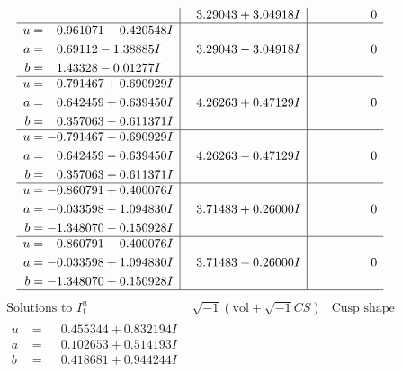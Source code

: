 \documentclass[1p]{elsarticle_modified}
\theoremstyle{definition}
\newcommand{\I}{\sqrt{-1}}
\begin{document}
$$\begin{array}{c|c|c}
 & \phantom{-}3.29043 + 3.04918 I & \phantom{-0.000000 } 0 \\ \hline\begin{aligned}
u &= -0.961071 - 0.420548 I \\
a &= \phantom{-}0.69112 - 1.38885 I \\
b &= \phantom{-}1.43328 - 0.01277 I\end{aligned}
 & \phantom{-}3.29043 - 3.04918 I & \phantom{-0.000000 } 0 \\ \hline\begin{aligned}
u &= -0.791467 + 0.690929 I \\
a &= \phantom{-}0.642459 + 0.639450 I \\
b &= \phantom{-}0.357063 - 0.611371 I\end{aligned}
 & \phantom{-}4.26263 + 0.47129 I & \phantom{-0.000000 } 0 \\ \hline\begin{aligned}
u &= -0.791467 - 0.690929 I \\
a &= \phantom{-}0.642459 - 0.639450 I \\
b &= \phantom{-}0.357063 + 0.611371 I\end{aligned}
 & \phantom{-}4.26263 - 0.47129 I & \phantom{-0.000000 } 0 \\ \hline\begin{aligned}
u &= -0.860791 + 0.400076 I \\
a &= -0.033598 - 1.094830 I \\
b &= -1.348070 - 0.150928 I\end{aligned}
 & \phantom{-}3.71483 + 0.26000 I & \phantom{-0.000000 } 0 \\ \hline\begin{aligned}
u &= -0.860791 - 0.400076 I \\
a &= -0.033598 + 1.094830 I \\
b &= -1.348070 + 0.150928 I\end{aligned}
 & \phantom{-}3.71483 - 0.26000 I & \phantom{-0.000000 } 0\\
 \hline 
 \end{array}$$\newpage$$\begin{array}{c|c|c}  
\text{Solutions to }I^u_{1}& \I (\text{vol} + \sqrt{-1}CS) & \text{Cusp shape}\\
 \hline 
\begin{aligned}
u &= \phantom{-}0.455344 + 0.832194 I \\
a &= \phantom{-}0.102653 + 0.514193 I \\
b &= \phantom{-}0.418681 + 0.944244 I\end{aligned}

\end{array}$$
\end{document}
